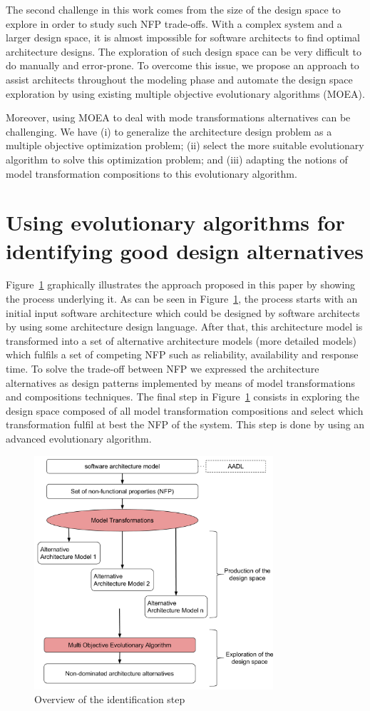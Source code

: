 \documentclass[conference]{IEEEtran}
\begin{document}
The second challenge in this work comes from the size of the design space to explore in order to study such NFP trade-offs. With a complex system and a larger design space, it is almost impossible for software architects to find optimal architecture designs. The exploration of such design space can be very difficult to do manually and error-prone. To overcome this issue, we propose an approach to assist architects throughout the modeling phase and automate the design space exploration by using existing multiple objective evolutionary algorithms (MOEA).

Moreover, using MOEA to deal with mode transformations alternatives can be challenging. We have (i) to generalize the architecture design problem as a multiple objective optimization problem; (ii) select the more suitable evolutionary algorithm to solve this optimization problem; and (iii) adapting the notions of model transformation compositions to this evolutionary algorithm.

\section{Using evolutionary algorithms for identifying good design alternatives}
\label{Approach}
Figure~\ref{IS} graphically illustrates the approach proposed in this paper by showing the process underlying it. As can be seen in Figure~\ref{IS}, the process starts with an initial input software architecture which could be designed by software architects by using some architecture design language\cite{Medvidovic}. After that, this architecture model is transformed into a set of alternative architecture models (more detailed models) which fulfils a set of competing NFP such as reliability, availability and response time. To solve the trade-off between NFP we expressed the architecture alternatives as design patterns implemented by means of model transformations and compositions techniques. The final step in Figure~\ref{IS} consists in exploring the design space composed of all model transformation compositions and select which transformation fulfil at best the NFP of the system. This step is done by using an advanced evolutionary algorithm.

\begin{figure}[!t]
\centering
\includegraphics[width=3.49in]{IDMT.pdf}
\caption{Overview of the identification step}
\label{IS}
\end{figure}
\end{document}
